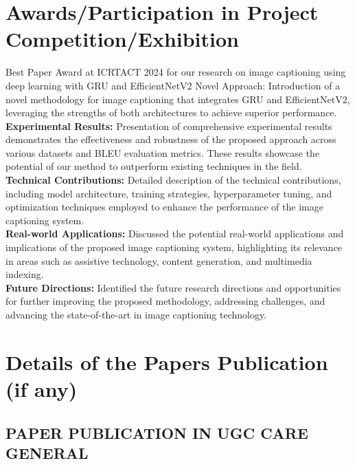 \documentclass[oneside,a4paper,12pt]{report}
\begin{document}
\begin{appendices}
\chapter{Awards/Participation in Project Competition/Exhibition}
Best Paper Award at ICRTACT 2024 for our research on image captioning using deep learning with GRU and EfficientNetV2 Novel Approach: Introduction of a novel methodology for image captioning that integrates GRU and EfficientNetV2, leveraging the strengths of both architectures to achieve superior performance.\\
\textbf{Experimental Results:} Presentation of comprehensive experimental results demonstrates the effectiveness and robustness of the proposed approach across various datasets and BLEU evaluation metrics. These results showcase the potential of our method to outperform existing techniques in the field.\\
\textbf{Technical Contributions:} Detailed description of the technical contributions, including model architecture, training strategies, hyperparameter tuning, and optimization techniques employed to enhance the performance of the image captioning system.\\
\textbf{Real-world Applications:} Discussed the potential real-world applications and implications of the proposed image captioning system, highlighting its relevance in areas such as assistive technology, content generation, and multimedia indexing.\\
\textbf{Future Directions:} Identified the future research directions and opportunities for further improving the proposed methodology, addressing challenges, and advancing the state-of-the-art in image captioning technology.

\chapter{Details of the Papers Publication (if any)}
\section{PAPER PUBLICATION IN UGC CARE GENERAL}


\end{appendices}
\end{document}
